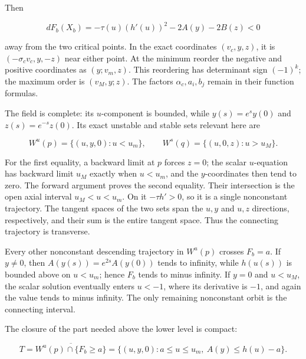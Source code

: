 Then

\begin{equation}
dF_b(X_b)=-\tau(u)(h'(u))^2-2A(y)-2B(z)<0
 \label{courseIII:creating-an-original-cancelling-handle-pair:eq:4.3}
\end{equation}

away from the two critical points. In the exact coordinates \((v_c,y,z)\), it is \((-\sigma_c v_c,y,-z)\) near either point. At the minimum reorder the negative and positive coordinates as \((y;v_m,z)\). This reordering has determinant sign \((-1)^k\); the maximum order is \((v_M,y;z)\). The factors \(\alpha_c,a_i,b_j\) remain in their function formulas.

The field is complete: its \(u\)-component is bounded, while \(y(s)=e^s y(0)\) and \(z(s)=e^{-s}z(0)\). Its exact unstable and stable sets relevant here are

\begin{equation}
W^u(p)=\{(u,y,0):u<u_m\},\qquad
 W^s(q)=\{(u,0,z):u>u_M\}.
 \label{courseIII:creating-an-original-cancelling-handle-pair:eq:4.4}
\end{equation}

For the first equality, a backward limit at \(p\) forces \(z=0\); the scalar \(u\)-equation has backward limit \(u_M\) exactly when \(u<u_m\), and the \(y\)-coordinates then tend to zero. The forward argument proves the second equality. Their intersection is the open axial interval \(u_M<u<u_m\). On it \(-\tau h'>0\), so it is a single nonconstant trajectory. The tangent spaces of the two sets span the \(u,y\) and \(u,z\) directions, respectively, and their sum is the entire tangent space. Thus the connecting trajectory is transverse.

Every other nonconstant descending trajectory in \(W^u(p)\) crosses \(F_b=a\). If \(y\ne0\), then \(A(y(s))=e^{2s}A(y(0))\) tends to infinity, while \(h(u(s))\) is bounded above on \(u<u_m\); hence \(F_b\) tends to minus infinity. If \(y=0\) and \(u<u_M\), the scalar solution eventually enters \(u<-1\), where its derivative is \(-1\), and again the value tends to minus infinity. The only remaining nonconstant orbit is the connecting interval.

The closure of the part needed above the lower level is compact:

\begin{equation}
T=\overline{W^u(p)\cap\{F_b\geq a\}}
   =\{(u,y,0): a\leq u\leq u_m,\ A(y)\leq h(u)-a\}.
 \label{courseIII:creating-an-original-cancelling-handle-pair:eq:4.5}
\end{equation}

